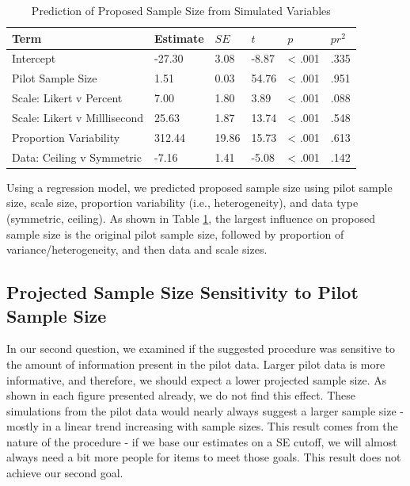 \documentclass[
  man]{apa7}
\begin{document}
\begin{table}[tbp]

\begin{center}
\begin{threeparttable}

\caption{\label{tab:table-predict-largest}Prediction of Proposed Sample Size from Simulated Variables}

\begin{tabular}{llllll}
\toprule
Term & Estimate & $SE$ & $t$ & $p$ & $pr^2$\\
\midrule
Intercept & -27.30 & 3.08 & -8.87 & < .001 & .335\\
Pilot Sample Size & 1.51 & 0.03 & 54.76 & < .001 & .951\\
Scale: Likert v Percent & 7.00 & 1.80 & 3.89 & < .001 & .088\\
Scale: Likert v Milllisecond & 25.63 & 1.87 & 13.74 & < .001 & .548\\
Proportion Variability & 312.44 & 19.86 & 15.73 & < .001 & .613\\
Data: Ceiling v Symmetric & -7.16 & 1.41 & -5.08 & < .001 & .142\\
\bottomrule
\end{tabular}

\end{threeparttable}
\end{center}

\end{table}

Using a regression model, we predicted proposed sample size using pilot sample size, scale size, proportion variability (i.e., heterogeneity), and data type (symmetric, ceiling). As shown in Table \ref{tab:table-predict-largest}, the largest influence on proposed sample size is the original pilot sample size, followed by proportion of variance/heterogeneity, and then data and scale sizes.

\subsection{Projected Sample Size Sensitivity to Pilot Sample Size}\label{projected-sample-size-sensitivity-to-pilot-sample-size}

In our second question, we examined if the suggested procedure was sensitive to the amount of information present in the pilot data. Larger pilot data is more informative, and therefore, we should expect a lower projected sample size. As shown in each figure presented already, we do not find this effect. These simulations from the pilot data would nearly always suggest a larger sample size - mostly in a linear trend increasing with sample sizes. This result comes from the nature of the procedure - if we base our estimates on a SE cutoff, we will almost always need a bit more people for items to meet those goals. This result does not achieve our second goal.
\end{document}
